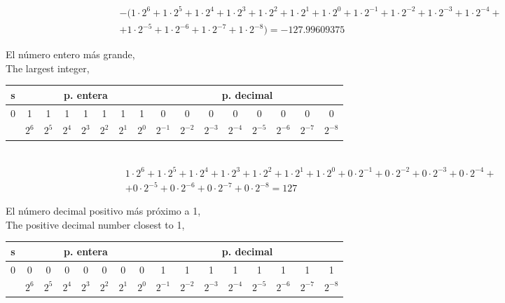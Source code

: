 \begin{equation*}
\begin{split}
&-(1\cdot 2^6+1 \cdot 2^5+ 1\cdot 2^4+ 1 \cdot 2^3+ 1 \cdot 2^2 + 1 \cdot 2^1 + 1 \cdot 2^0 + 1 \cdot 2^{-1}+ 1 \cdot 2^{-2}+ 1 \cdot 2^{-3}+ 1 \cdot 2^{-4}+\\
&+ 1 \cdot 2^{-5}+1 \cdot 2^{-6} +1 \cdot 2^{-7}+ 1\cdot 2^{-8}) =  -127.99609375
\end{split}
\end{equation*}

\begin{paracol}{2}
El número entero más grande,\\
\switchcolumn
The largest integer,
\end{paracol}

\begin{tabular}{|c||c|c|c|c|c|c|c||c|c|c|c|c|c|c|c|}
\hline
s&\multicolumn{7}{c||}{p. entera}&\multicolumn{8}{c|}{p. decimal}\\
\hline
0&1&1&1&1&1&1&1&0&0&0&0&0&0&0&0\\
\hline
&$2^{6}$&$2^{5}$&$2^{4}$&$2^{3}$&$2^{2}$&$2^{1}$&$2^{0}$&$2^{-1}$&$2^{-2}$&$2^{-3}$&$2^{-4}$&$2^{-5}$&$2^{-6}$&$2^{-7}$&$2^{-8}$\\
\hline
\end{tabular}\\

\begin{equation*}
\begin{split}
&1\cdot 2^6+1 \cdot 2^5+ 1\cdot 2^4+ 1 \cdot 2^3+ 1 \cdot 2^2 + 1 \cdot 2^1 + 1 \cdot 2^0 + 0 \cdot 2^{-1}+ 0 \cdot 2^{-2}+ 0 \cdot 2^{-3}+ 0 \cdot 2^{-4}+\\
&+ 0 \cdot 2^{-5}+0 \cdot 2^{-6} +0 \cdot 2^{-7}+0\cdot 2^{-8} =  127
\end{split}
\end{equation*}

\begin{paracol}{2}
El número decimal positivo más próximo a 1,\\
\switchcolumn
The positive decimal number closest to 1,\\
\end{paracol}

\begin{tabular}{|c||c|c|c|c|c|c|c||c|c|c|c|c|c|c|c|}
\hline
s&\multicolumn{7}{c||}{p. entera}&\multicolumn{8}{c|}{p. decimal}\\
\hline
0&0&0&0&0&0&0&0&1&1&1&1&1&1&1&1\\
\hline
&$2^{6}$&$2^{5}$&$2^{4}$&$2^{3}$&$2^{2}$&$2^{1}$&$2^{0}$&$2^{-1}$&$2^{-2}$&$2^{-3}$&$2^{-4}$&$2^{-5}$&$2^{-6}$&$2^{-7}$&$2^{-8}$\\
\hline
\end{tabular}\\

